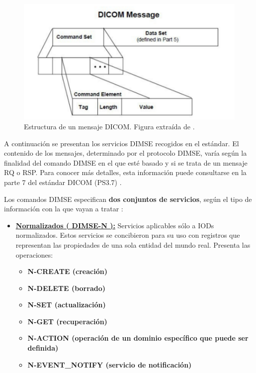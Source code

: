 \begin{figure}[!h]
\begin{center}
\includegraphics[width=1\textwidth]{images/estructura_msg_DICOM.png}
\caption{Estructura de un mensaje DICOM. Figura extraída de \cite{16}.}
\label{fig:estructura_msg_DICOM}
\end{center}
\end{figure}

A continuación se presentan los servicios \acs{DIMSE} recogidos en el estándar. El contenido de los mensajes, determinado por el protocolo \acs{DIMSE}, varía según la finalidad del comando \acs{DIMSE} en el que esté basado y si se trata de un mensaje RQ o RSP. Para conocer más detalles, esta información puede consultarse en la parte 7 del estándar DICOM (PS3.7) \cite{16}.

Los comandos \acs{DIMSE} especifican \textbf{dos conjuntos de servicios}, según el tipo de información con la que vayan a tratar \cite{11} \cite{16}:

\begin{itemize}
\item \textbf{\underline{Normalizados ( DIMSE-N ):}} Servicios aplicables sólo a IODs normalizados. Estos servicios se concibieron para su uso con registros que representan las propiedades de una sola entidad del mundo real. Presenta las operaciones:
\begin{itemize}
	\item \textbf{N-CREATE (creación)}
	\item \textbf{N-DELETE (borrado)}
	\item \textbf{N-SET (actualización)}
	\item \textbf{N-GET (recuperación)}
	\item \textbf{N-ACTION (operación de un dominio específico que puede ser definida)}
	\item \textbf{N-EVENT\_NOTIFY (servicio de notificación)}
\end{itemize}
\end{itemize}

